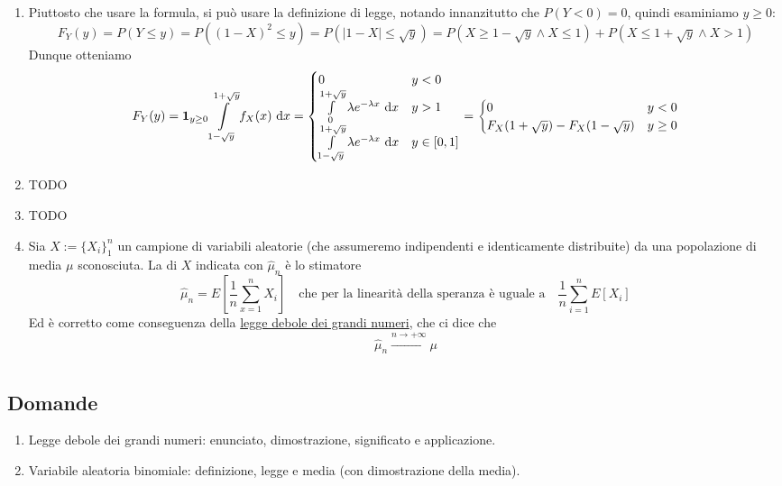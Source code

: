 \documentclass{article}
\begin{document}
\begin{enumerate}
    \item Piuttosto che usare la formula, si può usare la definizione di legge, notando innanzitutto che $P(Y < 0) = 0$, quindi esaminiamo $y\ge 0$:
    \[ F_Y(y) = P(Y\le y) = P((1-X)^2 \le y) = P(|1-X|\le \sqrt{y}) = P(X \ge 1-\sqrt{y} \wedge X \le 1) + P(X \le 1+\sqrt{y} \wedge X > 1)\]
    Dunque otteniamo
    \[F_Y(y) = \mathbf{1}_{y\ge 0} \int\limits_{1-\sqrt{y}}^{1+\sqrt{y}} f_X(x)\text{ d} x = \begin{cases}
        0 & y < 0\\
        \int\limits_{0}^{1+\sqrt{y}} \lambda e^{-\lambda x}\text{ d} x & y > 1\\
        \int\limits_{1-\sqrt{y}}^{1+\sqrt{y}}\lambda e^{-\lambda x}\text{ d} x & y \in [0,1]
    \end{cases} = \begin{cases}
        0 & y < 0\\
        F_X(1+\sqrt{y}) - F_X(1-\sqrt{y}) & y \ge 0
    \end{cases}\]
    \item TODO
    \item TODO
    \item Sia $X := \{X_i\}_1^n$ un campione di variabili aleatorie (che assumeremo indipendenti e identicamente distribuite) da una popolazione di media $\mu$ sconosciuta. La  di $X$ indicata con $\hat{\mu}_n$ è lo stimatore
    \[\hat{\mu}_n = E\left[\frac{1}{n}\sum_{x=1}^n X_i\right] \quad \text{che per la linearità della speranza è uguale a}\quad \frac{1}{n}\sum_{i=1}^n E[X_i]\]
    Ed è corretto come conseguenza della \href{th:WLLN}{legge debole dei grandi numeri}, che ci dice che 
    \[\hat{\mu}_n \xrightarrow{n\to +\infty} \mu\]
\end{enumerate}

\section{}%

\subsection*{Domande}

\begin{enumerate}
    \item Legge debole dei grandi numeri: enunciato, dimostrazione, significato e applicazione.
    \item Variabile aleatoria binomiale: definizione, legge e media (con dimostrazione della media).
\end{enumerate}
\end{document}
